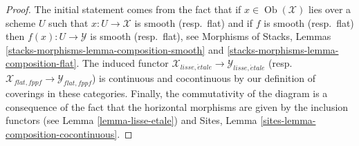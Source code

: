 \documentclass[10pt,a4paper]{amsart}
\theoremstyle{plain}
\theoremstyle{definition}
\theoremstyle{remark}
\numberwithin{equation}{subsection}
\def\Ob{\mathop{\mathrm{Ob}}\nolimits}
\def\etale{{\acute{e}tale}}
\begin{document}
\begin{proof}
The initial statement comes from the fact that if $x \in \Ob(\mathcal{X})$
lies over a scheme $U$ such that $x : U \to \mathcal{X}$ is smooth
(resp.\ flat) and if $f$ is smooth (resp.\ flat) then
$f(x) : U \to \mathcal{Y}$ is smooth (resp.\ flat), see
Morphisms of Stacks, Lemmas \ref{stacks-morphisms-lemma-composition-smooth} and
\ref{stacks-morphisms-lemma-composition-flat}. The induced functor
$\mathcal{X}_{lisse,\etale} \to \mathcal{Y}_{lisse,\etale}$
(resp.\ $\mathcal{X}_{flat,fppf} \to \mathcal{Y}_{flat,fppf}$) is
continuous and cocontinuous by our definition of coverings in these
categories. Finally, the commutativity of the diagram is a consequence of the
fact that the horizontal morphisms are given by the inclusion functors (see
Lemma \ref{lemma-lisse-etale}) and
Sites, Lemma \ref{sites-lemma-composition-cocontinuous}.


\end{proof}
\end{document}
